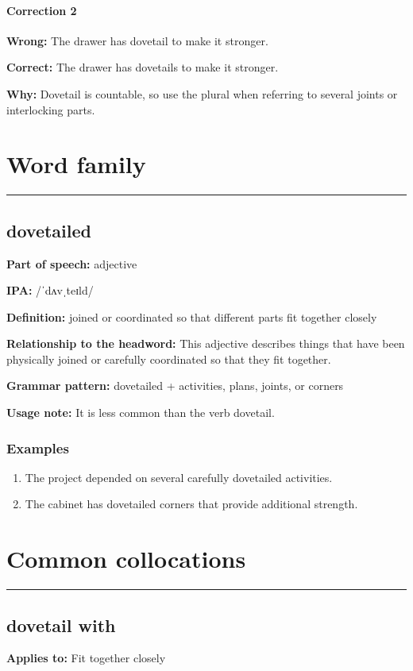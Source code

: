 \documentclass[11pt]{article}
\newcommand{\sectionrule}{\par\vspace{-0.5em}\noindent\textcolor{Accent}{\rule{\linewidth}{0.6pt}}\par}
\begin{document}
\paragraph{Correction 2}
\textbf{Wrong:} The drawer has dovetail to make it stronger.

\textbf{Correct:} The drawer has dovetails to make it stronger.

\textbf{Why:} Dovetail is countable, so use the plural when referring to several joints or interlocking parts.

\section{Word family}
\sectionrule
\subsection{dovetailed}
\textbf{Part of speech:} adjective

\textbf{IPA:} /ˈdʌvˌteɪld/

\textbf{Definition:} joined or coordinated so that different parts fit together closely

\textbf{Relationship to the headword:} This adjective describes things that have been physically joined or carefully coordinated so that they fit together.

\textbf{Grammar pattern:} dovetailed + activities, plans, joints, or corners

\textbf{Usage note:} It is less common than the verb dovetail.

\subsubsection{Examples}
\begin{enumerate}
  \item The project depended on several carefully dovetailed activities.
  \item The cabinet has dovetailed corners that provide additional strength.
\end{enumerate}

\section{Common collocations}
\sectionrule
\subsection{dovetail with}
\textbf{Applies to:} Fit together closely
\end{document}
